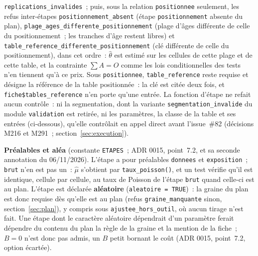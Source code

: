 \documentclass[a4paper,11pt]{article}
\newcommand{\code}[1]{\texttt{\small #1}}
\begin{document}
\code{replications\_invalides}~; puis, sous la relation \code{positionnee}
seulement, les refus inter-étapes \code{positionnement\_absent} (étape
\code{positionnement} absente du plan), \code{plage\_ages\_differente\_}\allowbreak\code{positionnement}
(plage d'âges différente de celle du positionnement~; les tranches d'âge
restent libres) et \code{table\_reference\_differente\_}\allowbreak\code{positionnement}
(clé différente de celle du positionnement), dans cet ordre~:
$\hat\theta$ est estimé sur les cellules de cette plage et de cette table,
et la contrainte $\sum A = O$ comme les lois conditionnelles des tests n'en
tiennent qu'à ce prix. Sous \code{positionnee}, \code{table\_reference}
reste requise et désigne la référence de la table positionnée~: la clé est
citée deux fois, et \code{fiche\$tables\_reference} n'en porte qu'une
entrée. La fonction d'étape ne refait aucun
contrôle~: ni la segmentation, dont la variante
\code{segmentation\_invalide} du module \code{validation} est retirée, ni
les paramètres, la classe de la table et ses entrées (ci-dessous), qu'elle
contrôlait en appel direct avant l'issue~\#82 (décisions M216 et M291~;
section~\ref{sec:execution}).

\medskip
\textbf{Préalables et aléa} (constante \code{ETAPES}~; ADR 0015,
point~7.2, et sa seconde annotation du 06/11/2026). L'étape a pour
préalables \code{donnees} et \code{exposition}~; \code{brut} n'en est pas
un~: $\hat\mu$ s'obtient par \code{taux\_poisson()}, et un test vérifie
qu'il est identique, cellule par cellule, au taux de Poisson de l'étape
\code{brut} quand celle-ci est au plan. L'étape est déclarée
\textbf{aléatoire} (\code{aleatoire = TRUE})~: la graine du plan est donc
requise dès qu'elle est au plan (refus \code{graine\_manquante} sinon,
section~\ref{sec:plan}), y compris sous \code{ajustee\_hors\_outil}, où
aucun tirage n'est fait. Une étape dont le caractère aléatoire dépendrait
d'un paramètre ferait dépendre du contenu du plan la règle de la graine et
la mention de la fiche~; $B = 0$ n'est donc pas admis, un $B$ petit
bornant le coût (ADR 0015, point~7.2, option écartée).
\end{document}
